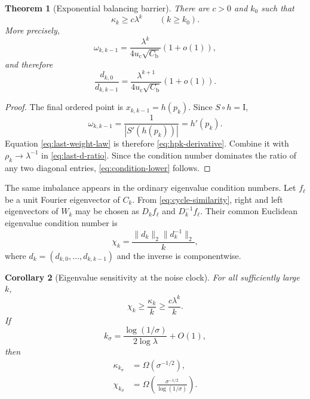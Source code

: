 \documentclass[11pt]{article}
\newtheorem{theorem}{Theorem}[section]
\newtheorem{corollary}[theorem]{Corollary}
\theoremstyle{definition}
\theoremstyle{remark}
\newcommand{\uc}{u_{\mathrm c}}
\newcommand{\Id}{\mathrm I}
\begin{document}
\begin{theorem}[Exponential balancing barrier]
\label{thm:conditioning-barrier}
There are $c>0$ and $k_0$ such that
\begin{equation}\label{eq:condition-lower}
 \boxed{
 \kappa_k\ge c\lambda^k
 \qquad(k\ge k_0).}
\end{equation}
More precisely,
\begin{equation}\label{eq:last-weight-law}
 \omega_{k,k-1}
 =\frac{\lambda^k}{4\uc\sqrt{C_{\mathrm b}}}(1+o(1)),
\end{equation}
and therefore
\begin{equation}\label{eq:ratio-asymptotic}
 \frac{d_{k,0}}{d_{k,k-1}}
 =\frac{\lambda^{k+1}}{4\uc\sqrt{C_{\mathrm b}}}(1+o(1)).
\end{equation}
\end{theorem}

\begin{proof}
The final ordered point is $x_{k,k-1}=h(p_k)$.  Since $S\circ h=\Id$,
\[
 \omega_{k,k-1}
 =\frac1{|S'(h(p_k))|}=h'(p_k).
\]
Equation \eqref{eq:last-weight-law} is therefore
\eqref{eq:hpk-derivative}.  Combine it with
$\rho_k\to\lambda^{-1}$ in \eqref{eq:last-d-ratio}.  Since the condition
number dominates the ratio of any two diagonal entries,
\eqref{eq:condition-lower} follows.
\end{proof}

The same imbalance appears in the ordinary eigenvalue condition numbers.
Let $f_\ell$ be a unit Fourier eigenvector of $C_k$.  From
\eqref{eq:cycle-similarity}, right and left eigenvectors of $W_k$ may be
chosen as $D_kf_\ell$ and $D_k^{-1}f_\ell$.  Their common Euclidean
eigenvalue condition number is
\begin{equation}\label{eq:eigenvalue-condition-exact}
 \chi_k
 =\frac{\|d_k\|_2\|d_k^{-1}\|_2}{k},
\end{equation}
where $d_k=(d_{k,0},\ldots,d_{k,k-1})$ and the inverse is componentwise.

\begin{corollary}[Eigenvalue sensitivity at the noise clock]
\label{cor:eigenvalue-conditioning}
For all sufficiently large $k$,
\begin{equation}\label{eq:eigen-condition-lower}
 \chi_k\ge\frac{\kappa_k}{k}
 \ge\frac{c\lambda^k}{k}.
\end{equation}
If
\begin{equation}\label{eq:noise-selected-k}
 k_\sigma
 =\frac{\log(1/\sigma)}{2\log\lambda}+O(1),
\end{equation}
then
\begin{align}
 \kappa_{k_\sigma}&=\Omega(\sigma^{-1/2}),
 \label{eq:condition-noise}\\
 \chi_{k_\sigma}
 &=\Omega\!\left(
 \frac{\sigma^{-1/2}}{\log(1/\sigma)}\right).
 \label{eq:eigen-condition-noise}
\end{align}
\end{corollary}
\end{document}
